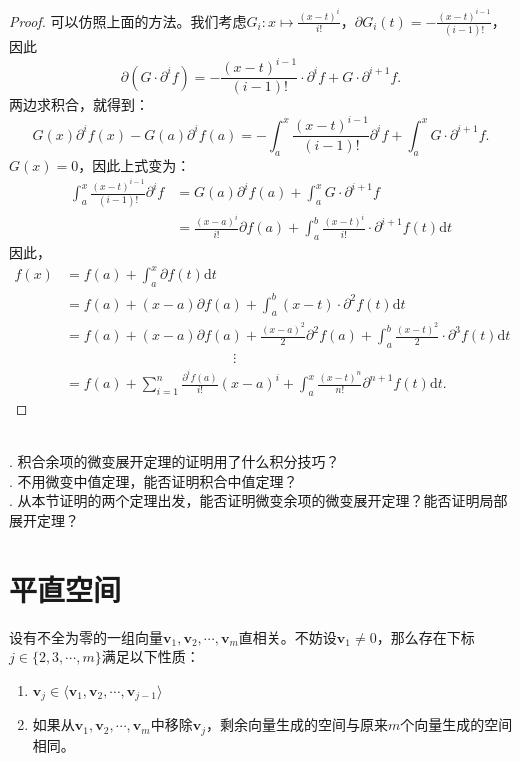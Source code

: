\documentclass[12pt,UTF8]{ctexbook}
\begin{document}
\begin{appendix}
\begin{proof}
    可以仿照上面的方法。我们考虑$G_i: x\mapsto \frac{(x - t)^i}{i!}$，$\partial G_i(t) = -\frac{(x - t)^{i-1}}{(i-1)!}$，
    因此
    $$ \partial (G\cdot \partial^i f) = -\frac{(x - t)^{i-1}}{(i-1)!} \cdot \partial^i f + G \cdot \partial^{i+1} f. $$
    两边求积合，就得到：
    $$ G(x) \partial^i f(x) - G(a) \partial^i f(a) = - \int_a^x \frac{(x - t)^{i-1}}{(i-1)!} \partial^i f + \int_a^x G \cdot \partial^{i+1} f. $$
    $G(x) = 0$，因此上式变为：
    \begin{align*}
        \int_a^x \frac{(x - t)^{i-1}}{(i-1)!}\partial^i f & = G(a) \partial^i f(a)  + \int_a^x G \cdot \partial^{i+1} f \\
        & = \frac{(x - a)^i}{i!} \partial f(a) + \int_a^b \frac{(x - t)^i}{i!}\cdot \partial^{i+1} f(t)\mathrm{d}t
    \end{align*}
    因此，
    \begin{align*}
        f(x) &= f(a) + \int_a^x \partial f(t) \mathrm{d}t \\
        &= f(a) + (x - a) \partial f(a) + \int_a^b (x - t) \cdot \partial^2 f(t) \mathrm{d}t \\
        &= f(a) + (x - a) \partial f(a) + \frac{(x - a)^2}{2} \partial^2 f(a) + \int_a^b \frac{(x - t)^2}{2} \cdot \partial^3 f(t) \mathrm{d}t\\
        & \qquad \qquad \qquad \qquad\qquad \qquad \vdots \\
        &= f(a) + \sum_{i=1}^n \frac{\partial^i f(a)}{i!} (x - a)^i + \int_a^x \frac{(x - t)^{n}}{n!} \partial^{n+1} f(t)\mathrm{d}t. 
    \end{align*}    
\end{proof}

\begin{sk}
    \mbox{} \\
    . 积合余项的微变展开定理的证明用了什么积分技巧？\\
    . 不用微变中值定理，能否证明积合中值定理？\\
    . 从本节证明的两个定理出发，能否证明微变余项的微变展开定理？能否证明局部展开定理？
\end{sk}

\chapter{平直空间}

\begin{tm}\label{tm:d-1-20}
    设有不全为零的一组向量$\mathbf{v}_1, \mathbf{v}_2 , \cdots , \mathbf{v}_m$直相关。不妨设$\mathbf{v}_1 \neq 0$，那么存在下标$j \in \{2,3, \cdots, m\}$满足以下性质：
    \begin{enumerate}
    \item $\mathbf{v}_j \in \langle \mathbf{v}_1, \mathbf{v}_2 , \cdots , \mathbf{v}_{j-1}\rangle$
    \item 如果从$\mathbf{v}_1, \mathbf{v}_2 , \cdots , \mathbf{v}_m$中移除$\mathbf{v}_j$，剩余向量生成的空间与原来$m$个向量生成的空间相同。
    \end{enumerate}
\end{tm}


\end{appendix}
\end{document}
